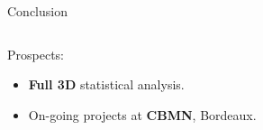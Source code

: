 \documentclass[10pt]{beamer}
\begin{document}
\begin{frame}{Conclusion}
\begin{columns}
\begin{column}{.2\textwidth}
    \end{column}
  \end{columns}

 


  \vspace{0.2cm}

  Prospects:
  \begin{itemize}
  \item \textbf{Full 3D} statistical analysis.
  \item On-going projects at \textbf{CBMN}, Bordeaux.
  \end{itemize}



\end{frame}

\section{}
\end{document}
